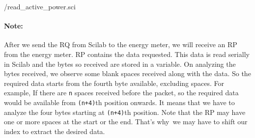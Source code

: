 \begin{scicode}
  \label{sci:modbus-power}
  
  {\LocMODscicode/read_active_power.sci}
\end{scicode}

\paragraph{Note: } After we send the RQ from Scilab to the energy meter, we will receive an RP from the energy meter. RP contains the data requested. This data
is read serially in Scilab and the bytes so received are stored in a variable. On analyzing the bytes received, we observe some blank spaces received along with the data. So the required data starts from the fourth byte available, excluding spaces. For example, If there are {\tt n} spaces received before the packet, so the required data would be available from {\tt (n+4)}th position onwards. It means that we have to analyze the four bytes starting at {\tt (n+4)}th position. Note that the RP may have one or more spaces at the start or the end. That's why we may have to shift our index to extract the desired data. 

